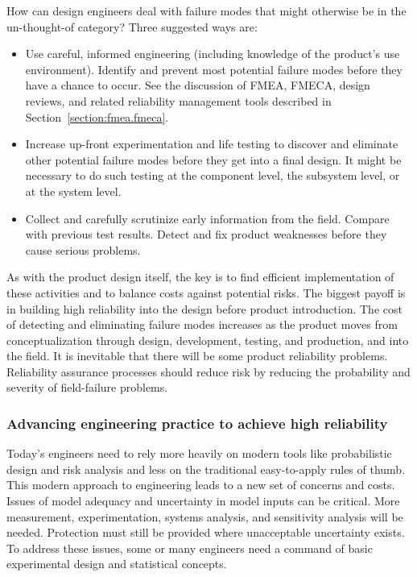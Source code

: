 How can design engineers deal with failure modes that might
otherwise be in the un-thought-of category?  Three suggested ways
are:
\begin{itemize}
\item
Use careful, informed engineering (including knowledge of the
product's use environment). Identify and prevent most potential
failure modes before they have a chance to occur. See the discussion
of FMEA, FMECA, design reviews, and related reliability management
tools described in Section~\ref{section:fmea.fmeca}.
\item
Increase up-front experimentation and life testing to discover and
eliminate other potential failure modes before they get into a final
design.  It might be necessary to do such testing at the component
level, the subsystem level, or at the system level.
\item
Collect and carefully scrutinize early information from the
field. Compare with previous test results.
Detect and fix product weaknesses before they cause serious problems.
\end{itemize} 
As with the product design itself, the key is to find efficient
implementation of these activities and to balance costs against
potential risks.  The biggest payoff is in building high reliability
into the design before product introduction.  The cost of detecting
and eliminating failure modes increases as the product moves from
conceptualization through design, development, testing, and
production, and into the field. It is inevitable that there will be
some product reliability problems. Reliability assurance processes
should reduce risk by reducing the probability and severity of
field-failure problems.


\subsubsection{\bf Advancing engineering practice to achieve high reliability}
Today's engineers need to rely more heavily on modern tools like
probabilistic design and risk analysis and less on the traditional
easy-to-apply rules of thumb.  This modern approach to engineering
leads to a new set of concerns and costs.  Issues of model adequacy
and uncertainty in model inputs can be critical. More measurement,
experimentation, systems analysis, and sensitivity analysis will be
needed. Protection must still be provided where unacceptable
uncertainty exists. To address these issues, some or many engineers
need a command of basic experimental design and statistical
concepts.

